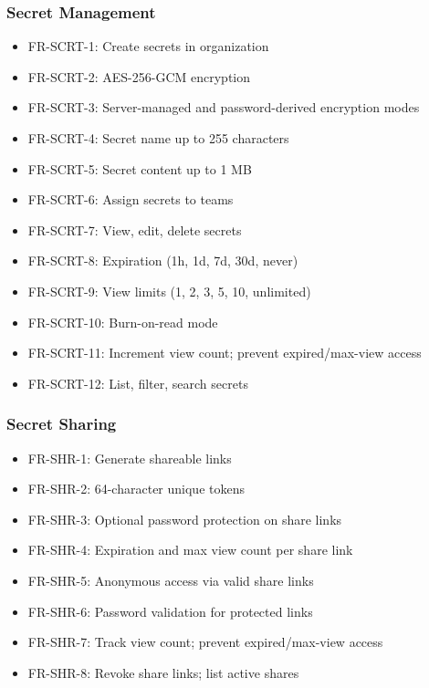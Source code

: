 \documentclass[12pt,a4paper]{article}
\begin{document}
\subsubsection*{Secret Management}
\begin{itemize}[leftmargin=*, itemsep=0.1em]
  \item FR-SCRT-1: Create secrets in organization
  \item FR-SCRT-2: AES-256-GCM encryption
  \item FR-SCRT-3: Server-managed and password-derived encryption modes
  \item FR-SCRT-4: Secret name up to 255 characters
  \item FR-SCRT-5: Secret content up to 1 MB
  \item FR-SCRT-6: Assign secrets to teams
  \item FR-SCRT-7: View, edit, delete secrets
  \item FR-SCRT-8: Expiration (1h, 1d, 7d, 30d, never)
  \item FR-SCRT-9: View limits (1, 2, 3, 5, 10, unlimited)
  \item FR-SCRT-10: Burn-on-read mode
  \item FR-SCRT-11: Increment view count; prevent expired/max-view access
  \item FR-SCRT-12: List, filter, search secrets
\end{itemize}

\subsubsection*{Secret Sharing}
\begin{itemize}[leftmargin=*, itemsep=0.1em]
  \item FR-SHR-1: Generate shareable links
  \item FR-SHR-2: 64-character unique tokens
  \item FR-SHR-3: Optional password protection on share links
  \item FR-SHR-4: Expiration and max view count per share link
  \item FR-SHR-5: Anonymous access via valid share links
  \item FR-SHR-6: Password validation for protected links
  \item FR-SHR-7: Track view count; prevent expired/max-view access
  \item FR-SHR-8: Revoke share links; list active shares
\end{itemize}
\end{document}
